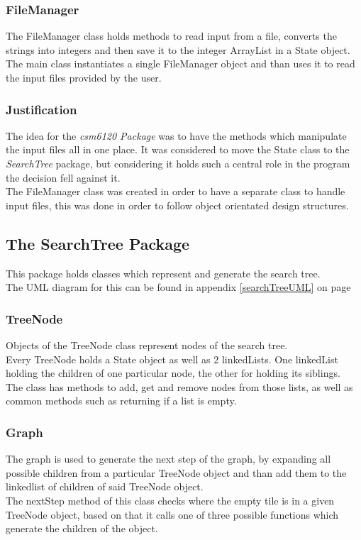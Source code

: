 \documentclass[journal]{IEEEtran}
\begin{document}
\subsubsection{FileManager}
The FileManager class holds methods to read input from a file, converts the strings into integers and then save it to the integer ArrayList in a State object. \\
The main class instantiates a single FileManager object and than uses it to read the input files provided by the user.\\

\subsubsection{Justification}
The idea for the \textit{csm6120 Package} was to have the methods which manipulate the input files all in one place. It was considered to move the State class to the \textit{SearchTree} package, but considering it holds such a central role in the program the decision fell against it. \\
The FileManager class was created in order to have a separate class to handle input files, this was done in order to follow object orientated design structures. \\

\subsection{The SearchTree Package}\label{sec:searchTreePackage}
This package holds classes which represent and generate the search tree.\\
The UML diagram for this can be found in appendix \ref{searchTreeUML} on page \pageref{searchTreeUML}\\

\subsubsection{TreeNode}
Objects of the TreeNode class represent nodes of the search tree. \\
Every TreeNode holds a State object as well as 2 linkedLists. One linkedList holding the children of one particular node, the other for holding its siblings. \\
The class has methods to add, get and remove nodes from those lists, as well as common methods such as returning if a list is empty. \\

\subsubsection{Graph}
The graph is used to generate the next step of the graph, by expanding all possible children from a particular TreeNode object and than add them to the linkedlist of children of said TreeNode object. \\
The nextStep method of this class checks where the empty tile is in a given TreeNode object, based on that it calls one of three possible functions which generate the children of the object. 
\end{document}
